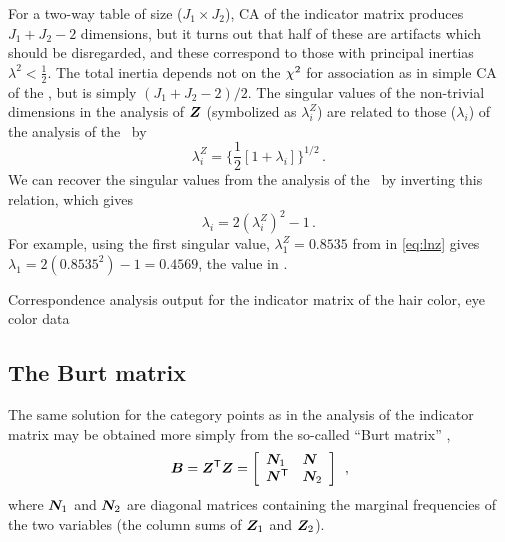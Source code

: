 For a two-way table of size ($J_1 \times J_2$), CA of the indicator matrix
produces $J_1 + J_2 - 2$ dimensions, but it turns out that half of these
are artifacts which should be disregarded, and these correspond to those
with principal inertias $\lambda^2 < \frac{1}{2}$.
The total inertia depends not on the $\chi^2$ for association
as in simple CA of the \ctab,
but is simply $(J_1 + J_2 - 2) / 2$.
The singular values of the non-trivial dimensions in the
analysis of $\bm{Z}$ (symbolized as $\lambda_i^Z$)
are related to those ($\lambda_i$) of the analysis of the \ctab\ by
\begin{equation*}%
 \lambda_i^Z = \{ \frac{1}{2} [ 1 + \lambda_i ] \}^{1/2}
 \period
\end{equation*}
We can recover the singular values from the analysis of the \ctab\
by inverting this relation, which gives
\begin{equation}\label{eq:lnz}
 \lambda_i = 2  (\lambda_i^Z)^2 - 1
 \period
\end{equation}
For example, using the first singular value, $\lambda_1^Z = 0.8535$ from
\outref{out:mcahair.1} in \eqref{eq:lnz}
gives $\lambda_1 = 2 ({0.8535} ^ 2) - 1 =  0.4569$,
the value in .

\begin{Output}[htb]
\caption{Correspondence analysis output for the indicator matrix of the hair color, eye color data}\label{out:mcahair.1}
\small

\end{Output}

%

\subsection{The Burt matrix}\label{sec:mca-burt}
The same solution for the category points as in the
analysis of the indicator matrix may be obtained more simply
from the so-called ``Burt matrix'' \citep{Burt:50},
\begin{equation*}%
 \mat{B} = \mat{Z}\trans \mat{Z}
 =
 \left[
 \begin{array}{ll}
 \mat{N}_{1} & \mat{N} \\
 \mat{N}\trans & \mat{N}_{2} \\
 \end{array}
 \right]
 \comma
\end{equation*}
where $\bm{N}_{1}$ and $\bm{N}_{2}$ are diagonal matrices containing
the marginal frequencies of the two variables (the column sums of
$\bm{Z}_1$ and $\bm{Z}_2$).

